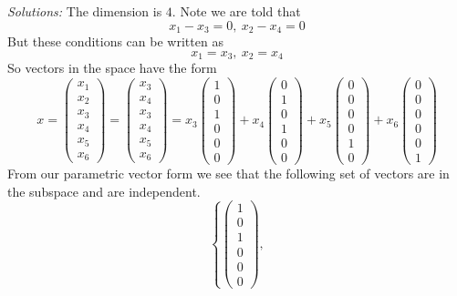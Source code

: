     \ifnum {} {\color{DarkBlue} \textit{Solutions:} The dimension is $4$. Note we are told that 
    $$x_1 - x_3 = 0, \ x_2-x_4 =0$$
    But these conditions can be written as
    $$x_1 = x_3 , \ x_2 = x_4 $$
    So vectors in the space have the form 
    $$ x 
    = \begin{pmatrix} x_1 \\ x_2 \\ x_3 \\ x_4 \\ x_5 \\ x_6 \end{pmatrix} 
    = \begin{pmatrix} x_3 \\ x_4 \\ x_3 \\ x_4 \\ x_5 \\ x_6 \end{pmatrix}
    = x_3\begin{pmatrix} 1 \\ 0 \\ 1 \\ 0\\ 0 \\ 0 \end{pmatrix} 
    + x_4\begin{pmatrix}  0 \\ 1 \\ 0\\ 1 \\ 0 \\ 0 \end{pmatrix}
    + x_5\begin{pmatrix}  0 \\ 0 \\ 0\\ 0 \\ 1 \\ 0 \end{pmatrix}
    + x_6\begin{pmatrix}  0 \\ 0 \\ 0\\ 0 \\ 0 \\ 1 \end{pmatrix}
    $$
    From our parametric vector form we see that the following set of vectors are in the subspace and are independent. 
    $$
    \left\{
    \begin{pmatrix} 1 \\ 0 \\ 1 \\ 0\\ 0 \\ 0 \end{pmatrix},
$$}
